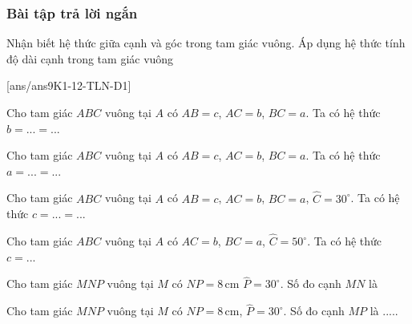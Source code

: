 \subsubsection{Bài tập trả lời ngắn}
\begin{dang}{Nhận biết hệ thức giữa cạnh và góc trong tam giác vuông. Áp dụng hệ thức tính độ dài cạnh trong tam giác vuông}
\end{dang}
[ans/ans9K1-12-TLN-D1]
\begin{ex}%
	Cho tam giác $ABC$ vuông tại $A$ có $AB=c$, $AC=b$, $BC=a$. Ta có hệ thức $b=...=...$
\end{ex}
\begin{ex}%
	Cho tam giác $ABC$ vuông tại $A$ có $AB=c$, $AC=b$, $BC=a$. Ta có hệ thức $a=...=...$
\end{ex}
\begin{ex}%
	Cho tam giác $ABC$ vuông tại $A$ có $AB=c$, $AC=b$, $BC=a$, $\widehat{C}=30^{\circ}$. Ta có hệ thức $c=...=...$
\end{ex}
\begin{ex}%
	Cho tam giác $ABC$ vuông tại $A$ có $AC=b$, $BC=a$, $\widehat{C}=50^{\circ}$. Ta có hệ thức $c=...$
\end{ex}
\begin{ex}%
	Cho tam giác $MNP$ vuông tại $M$ có $NP=8\,\text{cm}$ $\widehat{P}=30^{\circ}$. Số đo cạnh $MN$ là
\end{ex}
\begin{ex}%
	Cho tam giác $MNP$ vuông tại $M$ có $NP=8\,\text{cm}$, $\widehat{P}=30^{\circ}$. Số đo cạnh $MP$ là .....
\end{ex}
